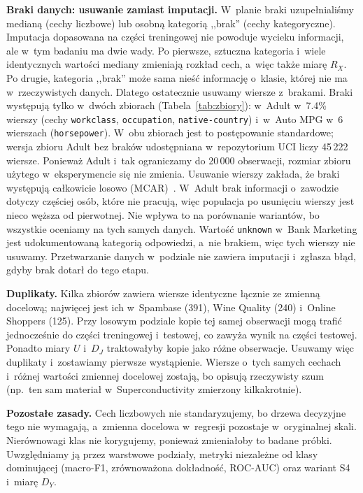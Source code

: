 \documentclass[11pt,a4paper]{article}
\begin{document}
\textbf{Braki danych: usuwanie zamiast imputacji.} W~planie braki uzupełnialiśmy medianą (cechy liczbowe) lub osobną kategorią ,,brak'' (cechy kategoryczne). Imputacja dopasowana na części treningowej nie powoduje wycieku informacji, ale w~tym badaniu ma dwie wady. Po pierwsze, sztuczna kategoria i~wiele identycznych wartości mediany zmieniają rozkład cech, a~więc także miarę $R_X$. Po drugie, kategoria ,,brak'' może sama nieść informację o~klasie, której nie ma w~rzeczywistych danych. Dlatego ostatecznie usuwamy wiersze z~brakami. Braki występują tylko w~dwóch zbiorach (Tabela~\ref{tab:zbiory}): w~Adult w~7.4\% wierszy (cechy \texttt{workclass}, \texttt{occupation}, \texttt{native-country}) i~w~Auto MPG w~6 wierszach (\texttt{horsepower}). W~obu zbiorach jest to postępowanie standardowe; wersja zbioru Adult bez braków udostępniana w~repozytorium UCI liczy 45\,222 wiersze. Ponieważ Adult i~tak ograniczamy do 20\,000 obserwacji, rozmiar zbioru użytego w~eksperymencie się nie zmienia. Usuwanie wierszy zakłada, że braki występują całkowicie losowo (MCAR)~\cite{little2019}. W~Adult brak informacji o~zawodzie dotyczy częściej osób, które nie pracują, więc populacja po usunięciu wierszy jest nieco węższa od pierwotnej. Nie wpływa to na porównanie wariantów, bo wszystkie oceniamy na tych samych danych. Wartość \texttt{unknown} w~Bank Marketing jest udokumentowaną kategorią odpowiedzi, a~nie brakiem, więc tych wierszy nie usuwamy. Przetwarzanie danych w~podziale nie zawiera imputacji i~zgłasza błąd, gdyby brak dotarł do tego etapu.

\textbf{Duplikaty.} Kilka zbiorów zawiera wiersze identyczne łącznie ze zmienną docelową; najwięcej jest ich w~Spambase (391), Wine Quality (240) i~Online Shoppers (125). Przy losowym podziale kopie tej samej obserwacji mogą trafić jednocześnie do części treningowej i~testowej, co zawyża wynik na części testowej. Ponadto miary $U$ i~$D_J$ traktowałyby kopie jako różne obserwacje. Usuwamy więc duplikaty i~zostawiamy pierwsze wystąpienie. Wiersze o~tych samych cechach i~różnej wartości zmiennej docelowej zostają, bo opisują rzeczywisty szum (np.\ ten sam materiał w~Superconductivity zmierzony kilkakrotnie).

\textbf{Pozostałe zasady.} Cech liczbowych nie standaryzujemy, bo drzewa decyzyjne tego nie wymagają, a~zmienna docelowa w~regresji pozostaje w~oryginalnej skali. Nierównowagi klas nie korygujemy, ponieważ zmieniałoby to badane próbki. Uwzględniamy ją przez warstwowe podziały, metryki niezależne od klasy dominującej (macro-F1, zrównoważona dokładność, ROC-AUC) oraz wariant S4 i~miarę $D_Y$.
\end{document}
